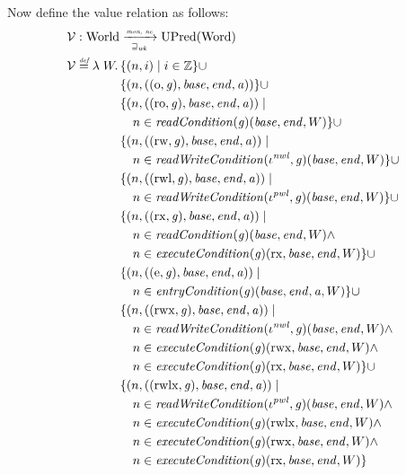 \documentclass{article}
\newcommand{\defeq}{\stackrel{\textit{\tiny{def}}}{=}}
\newcommand{\union}{\mathbin{\cup}}
\newcommand{\var}[1]{\mathit{#1}}
\newcommand{\gl}{\var{g}}
\newcommand{\addr}{\var{a}}
\newcommand{\start}{\var{base}}
\newcommand{\addrend}{\var{end}}
\newcommand{\perm}{\var{perm}}
\newcommand{\stdcap}[1][(\perm,\gl)]{\left(#1,\start,\addrend,\addr \right)}
\newcommand{\plainfun}[2]{
  \ifthenelse{\equal{#2}{}}
             {\mathit{#1}}
             {\mathit{#1}(#2)}
}
\newcommand{\readCond}[1]{\plainfun{readCondition}{#1}}
\newcommand{\writeCond}[1]{\plainfun{readWriteCondition}{#1}}
\newcommand{\execCond}[1]{\plainfun{executeCondition}{#1}}
\newcommand{\entryCond}[1]{\plainfun{entryCondition}{#1}}
\newcommand{\futurewk}{\mathbin{\sqsupseteq}_{\var{wk}}}
\newcommand{\monwknefun}{\xrightarrow[\text{\tiny{$\futurewk$}}]{\textit{\tiny{mon, ne}}}}
\newcommand{\asmType}{\plaindom{AsmType}}
\newcommand{\plaindom}[1]{\mathrm{#1}}
\newcommand{\Words}{\plaindom{Word}}
\newcommand{\ints}{\mathbb{Z}}
\newcommand{\Worlds}{\plaindom{World}}
\newcommand{\UPred}[1]{\plaindom{UPred}(#1)}
\newcommand{\intr}[2]{\mathcal{#1}}
\newcommand{\valueintr}[1]{\intr{V}{#1}}
\newcommand{\stdvr}{\valueintr{\asmType}}
\newcommand{\npair}[2][n]{\left(#1,#2 \right)}
\newcommand{\plainperm}[1]{\mathrm{#1}}
\newcommand{\noperm}{\plainperm{o}}
\newcommand{\readonly}{\plainperm{ro}}
\newcommand{\readwrite}{\plainperm{rw}}
\newcommand{\exec}{\plainperm{rx}}
\newcommand{\entry}{\plainperm{e}}
\newcommand{\rwx}{\plainperm{rwx}}
\newcommand{\readwritel}{\plainperm{rwl}}
\newcommand{\rwlx}{\plainperm{rwlx}}
\begin{document}
Now define the value relation as follows:
\begin{align*}
  &\stdvr : \Worlds \monwknefun \UPred{\Words} \\
  &\stdvr\defeq \lambda \; W \ldotp 
           \begin{aligned}[t]
             & \{ \npair{i} \mid i \in \ints \} 
             \union \\
             & \{ \npair{\stdcap[(\noperm,\gl)] }  \} 
             \union \\
             & \{ \npair{\stdcap[(\readonly,\gl)] } \mid \\
             & \quad n \in \readCond{}(\gl)(\start,\addrend,W)\} 
             \union \\
             & \{ \npair{\stdcap[(\readwrite,\gl)] } \mid \\
             & \quad n \in \writeCond{}(\iota^{\var{nwl}},\gl)(\start,\addrend,W) \}
             \union \\
             & \{ \npair{\stdcap[(\readwritel,\gl)] } \mid \\
             & \quad n \in \writeCond{}(\iota^{\var{pwl}},\gl)(\start,\addrend,W) \} \union \\
             & \{ \npair{\stdcap[(\exec,\gl)]} \mid \\
             & \quad n \in \readCond{}(\gl)(\start,\addrend,W) \land \\
             & \quad n \in \execCond{}(\gl)(\exec,\start,\addrend,W) \}
             \union \\
             & \{ \npair{\stdcap[(\entry,\gl)]} \mid \\
             & \quad n \in \entryCond{}(\gl)(\start,\addrend,\addr,W)\} 
             \union \\
             & \{ \npair{\stdcap[(\rwx,\gl)]} \mid \\
             & \quad n \in \writeCond{}(\iota^{\var{nwl}},\gl)(\start,\addrend,W) \land\\
             & \quad n \in \execCond{}(\gl)(\rwx,\start,\addrend,W)  \land \\
             & \quad n \in \execCond{}(\gl)(\exec,\start,\addrend,W) \}
             \union \\
             & \{ \npair{\stdcap[(\rwlx,\gl)]} \mid \\
             & \quad n \in \writeCond{}(\iota^{\var{pwl}},\gl)(\start,\addrend,W) \land\\
             & \quad n \in \execCond{}(\gl)(\rwlx,\start,\addrend,W) \land \\
             & \quad n \in \execCond{}(\gl)(\rwx,\start,\addrend,W) \land \\
             & \quad n \in \execCond{}(\gl)(\exec,\start,\addrend,W) \}
           \end{aligned}
\end{align*}
\end{document}
